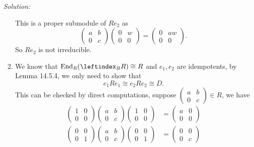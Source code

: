 \documentclass[a4paper, 12pt]{article}
\newenvironment{solution}
    {\textit{Solution:}}
    {}
\begin{document}
\begin{solution}
\begin{enumerate}[(1)]
This is a proper submodule of \(Re_2\) as 
\[\begin{pmatrix}
    a&b\\ 
    0&c
\end{pmatrix}\begin{pmatrix}
    0&w\\ 
    0&0
\end{pmatrix}=\begin{pmatrix}
    0&aw\\ 
    0&0
\end{pmatrix}.\]
So \(Re_2\) is not irreducible.
\item We know that \(\text{End}_R(\leftindex_R R)\cong R\) and \(e_1,e_2\) are idempotents, by Lemma 14.5.4, we only need to show that 
\[e_1Re_1\cong e_2Re_2\cong D.\]
This can be checked by direct computations, suppose \(\begin{pmatrix}
    a&b\\ 
    0&c
\end{pmatrix}\in R\), we have 
\begin{align*}
    \begin{pmatrix}
        1&0\\ 
        0&0
    \end{pmatrix}\begin{pmatrix}
        a&b\\ 
        0&c
    \end{pmatrix}\begin{pmatrix}
        1&0\\ 
        0&0
    \end{pmatrix}&=\begin{pmatrix}
        a&0\\ 
        0&0
    \end{pmatrix}\\[5pt]
    \begin{pmatrix}
        0&0\\ 
        0&1
    \end{pmatrix}\begin{pmatrix}
        a&b\\ 
        0&c
    \end{pmatrix}\begin{pmatrix}
        0&0\\ 
        0&1
    \end{pmatrix}&=\begin{pmatrix}
        0&0\\ 
        0&c
    \end{pmatrix}
\end{align*}

\end{enumerate}
\end{solution}
\end{document}
